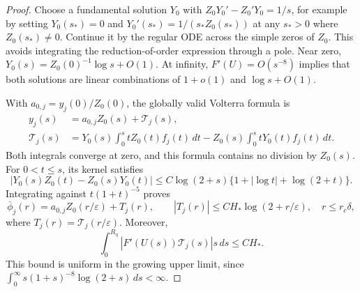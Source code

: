 \documentclass[11pt,reqno]{amsart}
\numberwithin{equation}{section}
\theoremstyle{definition}
\theoremstyle{remark}
\newcommand{\eps}{\varepsilon}
\begin{document}
\begin{proof}
Choose a fundamental solution $Y_0$ with
$Z_0Y_0'-Z_0'Y_0=1/s$, for example by setting
$Y_0(s_*)=0$ and $Y_0'(s_*)=1/(s_*Z_0(s_*))$ at any
$s_*>0$ where $Z_0(s_*)\ne0$. Continue it by the regular ODE
across the simple zeros of $Z_0$. This avoids integrating the
reduction-of-order expression through a pole.
Near zero,
$Y_0(s)=Z_0(0)^{-1}\log s+O(1)$.
At infinity, $F'(U)=O(s^{-8})$ implies that both solutions are
linear combinations of $1+o(1)$ and $\log s+O(1)$.

With $a_{0,j}=y_j(0)/Z_0(0)$, the globally valid Volterra formula is
\begin{equation}\label{cs:eq:radial-volterra}
 \begin{split}
 y_j(s)&=a_{0,j}Z_0(s)+\mathcal T_j(s),\\
 \mathcal T_j(s)&=Y_0(s)\int_0^s tZ_0(t)f_j(t)\,dt
                  -Z_0(s)\int_0^s tY_0(t)f_j(t)\,dt.
 \end{split}
\end{equation}
Both integrals converge at zero, and this formula contains no
division by $Z_0(s)$. For $0<t\le s$, its kernel satisfies
\[
 |Y_0(s)Z_0(t)-Z_0(s)Y_0(t)|
   \le C\log(2+s)\{1+|\log t|+\log(2+t)\}.
\]
Integrating against $t(1+t)^{-5}$ proves
\begin{equation}\label{cs:eq:radialaverage}
 \bar\phi_j(r)=a_{0,j}Z_0(r/\eps)+T_j(r),\qquad
 |T_j(r)|\le CH_*\log(2+r/\eps),\quad r\le r_c\delta,
\end{equation}
where $T_j(r)=\mathcal T_j(r/\eps)$. Moreover,
\begin{equation}\label{cs:eq:radial-weighted-error}
 \int_0^{R_\eta}|F'(U(s))\mathcal T_j(s)|s\,ds\le CH_*.
\end{equation}
This bound is uniform in the growing upper limit, since
$\int_0^\infty s(1+s)^{-8}\log(2+s)\,ds<\infty$.


\end{proof}
\end{document}
